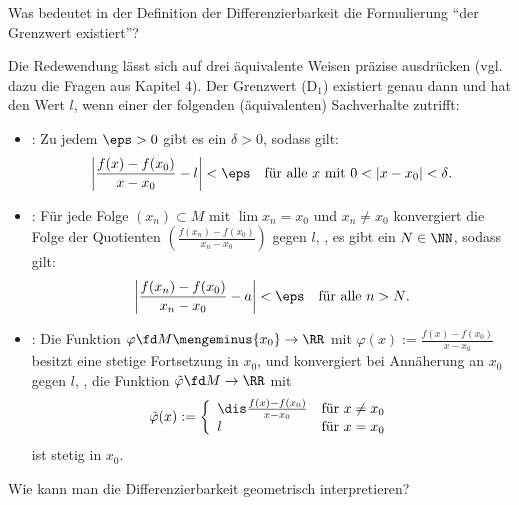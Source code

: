 \begin{frage}
Was bedeutet in der Definition der Differenzierbarkeit die Formulierung 
"`der Grenzwert existiert"'?
\end{frage}

\begin{antwort}
Die Redewendung lässt sich auf drei äquivalente Weisen präzise 
ausdrücken (vgl. dazu die Fragen aus Kapitel 4). Der Grenzwert (D$_1$) existiert 
genau dann und hat den Wert $l$, 
wenn einer der folgenden (äquivalenten) Sachverhalte zutrifft:
{\setlength{\labelsep}{4mm}
\begin{itemize}
\item[\desc{i}] : 
Zu jedem $\eps > 0$ gibt es ein $\delta>0$, sodass 
gilt: 
\[ \left| \frac{f(x)-f(x_0)}{x-x_0} - l \right| < \eps
\quad\text{für alle $x$ mit $0<|x-x_0|<\delta$}.
 \]
\item[\desc{ii}] : Für jede Folge 
$(x_n) \subset M$ mit 
$\lim x_n = x_0$ und $x_n\not=x_0$ konvergiert die Folge der Quotienten 
$\left( \frac{ f(x_n)-f(x_0) }{ x_n - x_0 } \right)$ gegen $l$, 
{\dasheisst}, es gibt ein $N\in \NN$, sodass gilt:
\[ 
\left| \frac{f(x_n)-f(x_0)}{x_n-x_0} -a  \right| < \eps 
\quad\text{für alle $n>N$}.
\]
\item[\desc{iii}] : Die Funktion 
$\varphi \fd  M\mengeminus \{x_0\} \to \RR$ mit  
$\varphi( x ) := \frac{f(x)-f(x_0)}{x-x_0}$ besitzt eine 
stetige Fortsetzung in $x_0$, und konvergiert bei Annäherung an 
$x_0$ gegen $l$, {\dasheisst}, die Funktion $\tilde{\varphi} \fd M \to \RR$ 
mit 
\[
\tilde{\varphi}(x) := \left\{ \begin{array}{ll} 
\dis \frac{f(x)-f(x_0)}{x-x_0} & \text{für $x\not=x_0$} \\
l & \text{für $x=x_0$} \end{array}\right.
\]
ist stetig in $x_0$. \AntEnd 
\end{itemize}}
\end{antwort}


\begin{frage}
Wie kann man die Differenzierbarkeit geometrisch interpretieren?
\end{frage}

